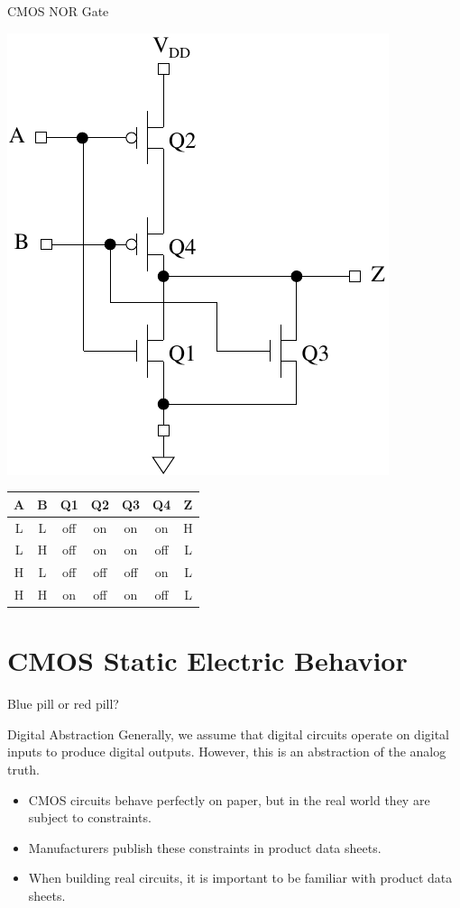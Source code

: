 \begin{frame}{CMOS NOR Gate}
  \begin{center}
    \includegraphics[scale=0.8]{CMOSNORGate}
  \end{center}
\end{frame}

\begin{tabular}{ccccccc}
  \textbf{A} & \textbf{B} & \textbf{Q1} & \textbf{Q2} & \textbf{Q3} & \textbf{Q4} & \textbf{Z} \\
  \hline
  L & L & off & on & on & on & H\\
  L & H & off & on & on & off & L\\
  H & L & off & off & off & on & L\\
  H & H & on & off & on & off & L\\
\end{tabular}

\section{CMOS Static Electric Behavior}

\begin{frame}{Blue pill or red pill?}
  \begin{block}{Digital Abstraction}
    Generally, we assume that digital circuits operate on digital inputs to produce digital outputs.  However, this is an abstraction of the analog truth.
  \end{block}
  \begin{itemize}
    \item CMOS circuits behave perfectly on paper, but in the real world they are subject to constraints.
    \item Manufacturers publish these constraints in product data sheets.
    \item When building real circuits, it is important to be familiar with product data sheets.
  \end{itemize}
\end{frame}

